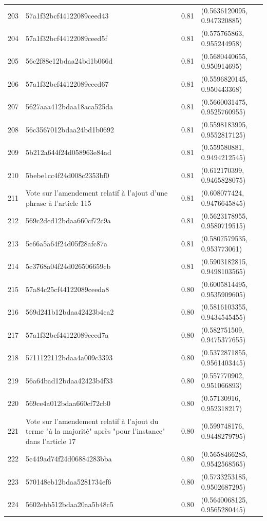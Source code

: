\begin{table}[ht]
\begin{tabular}{rlrl}
  203 & 57a1f32bcf44122089ceed43 & 0.81 & (0.5636120095, 0.947320885) \\ 
  204 & 57a1f32bcf44122089ceed5f & 0.81 & (0.575765863, 0.955244958) \\ 
  205 & 56c2f88e12bdaa24bd1b066d & 0.81 & (0.5680440655, 0.950914695) \\ 
  206 & 57a1f32bcf44122089ceed67 & 0.81 & (0.5596820145, 0.950443368) \\ 
  207 & 5627aaa412bdaa18aca525da & 0.81 & (0.5660031475, 0.9525760955) \\ 
  208 & 56c3567012bdaa24bd1b0692 & 0.81 & (0.5598183995, 0.9552817125) \\ 
  209 & 5b212a644f24d058963e84ad & 0.81 & (0.559580881, 0.9494212545) \\ 
  210 & 5bebe1cc4f24d008c2353bf0 & 0.81 & (0.612170399, 0.9465828075) \\ 
  211 & Vote sur l'amendement relatif à l'ajout d'une phrase à l'article 115 & 0.81 & (0.608077424, 0.9476645845) \\ 
  212 & 569c2dcd12bdaa660cf72c9a & 0.81 & (0.5623178955, 0.9580719515) \\ 
  213 & 5c66a5a64f24d05f28afc87a & 0.81 & (0.5807579535, 0.953773061) \\ 
  214 & 5c3768a04f24d026506659cb & 0.81 & (0.5903182815, 0.9498103565) \\ 
  215 & 57a84c25cf44122089ceeda8 & 0.80 & (0.6005814495, 0.9535909605) \\ 
  216 & 569d241b12bdaa42423b4ca2 & 0.80 & (0.5816103355, 0.9434545455) \\ 
  217 & 57a1f32bcf44122089ceed7a & 0.80 & (0.582751509, 0.9475377655) \\ 
  218 & 5711122112bdaa4a009c3393 & 0.80 & (0.5372871855, 0.9561403445) \\ 
  219 & 56a64bad12bdaa42423b4f33 & 0.80 & (0.557770902, 0.951066893) \\ 
  220 & 569ce4a012bdaa660cf72cb0 & 0.80 & (0.57130916, 0.952318217) \\ 
  221 & Vote sur l'amendement relatif à l'ajout du terme "à la majorité" après "pour l’instance" dans l'article 17 & 0.80 & (0.599748176, 0.9448279795) \\ 
  222 & 5c449ad74f24d06884283bba & 0.80 & (0.5658466285, 0.9542568565) \\ 
  223 & 570148eb12bdaa5281734ef6 & 0.80 & (0.5733253185, 0.9502687295) \\ 
  224 & 5602ebb512bdaa20aa5b48c5 & 0.80 & (0.5640068125, 0.9565280445) \\ 

\end{tabular}
\end{table}
